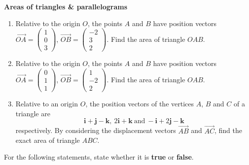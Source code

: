 \documentclass[a4paper,11pt,oneside]{book}
\providecommand{\vv}[1]{\overrightarrow{#1}}\providecommand{\cvv}[3]{\begin{pmatrix}#1\\#2\\#3\end{pmatrix}}
\newcounter{wq}[section]
\newcommand{\Q}[1]{\par\needspace{5\baselineskip}\medskip\stepcounter{wq}\noindent\textbf{\thewq}\quad #1\par}
\begin{document}
\Q{\textbf{Areas of triangles \& parallelograms}\par\smallskip \begin{enumerate}[label=(\alph*)]
\item Relative to the origin $O$, the points $A$ and $B$ have position vectors $\vv{OA}=\cvv{1}{0}{3}$, $\vv{OB}=\cvv{-2}{3}{2}$. Find the area of triangle $OAB$.
\item Relative to the origin $O$, the points $A$ and $B$ have position vectors $\vv{OA}=\cvv{0}{1}{1}$, $\vv{OB}=\cvv{1}{-2}{2}$. Find the area of triangle $OAB$.
\item Relative to an origin $O$, the position vectors of the vertices $A$, $B$ and $C$ of a triangle are
\[
\mathbf i+\mathbf j-\mathbf k,\ 2\mathbf i+\mathbf k\ \text{and}\ -\mathbf i+2\mathbf j-\mathbf k
\]
respectively. By considering the displacement vectors $\vv{AB}$ and $\vv{AC}$, find the exact area of triangle $ABC$.
\end{enumerate}}
\endgroup
\clearpage
\Q{For the following statements, state whether it is \textbf{true} or \textbf{false}.}
\end{document}
